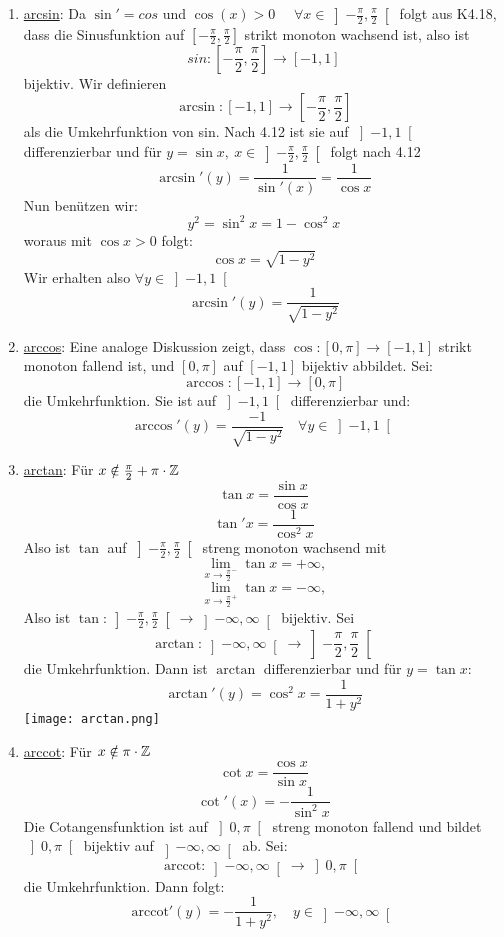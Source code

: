 \begin{enumerate}
    \item \underline{arcsin}: Da \(\sin' = cos\) und \( \cos(x) > 0 \quad\) \newline \(\forall x \in \left]-\frac{\pi}{2}, \frac{\pi}{2} \right[\) folgt aus K4.18, dass die Sinusfunktion auf \(\left[-\frac{\pi}{2}, \frac{\pi}{2}\right]\) strikt monoton wachsend ist, also ist
    \[ sin:\left[-\frac{\pi}{2}, \frac{\pi}{2}\right] \rightarrow \left[-1,1\right]\]
    bijektiv. Wir definieren
    \[\arcsin : \left[-1,1\right] \rightarrow \left[ -\frac{\pi}{2}, \frac{\pi}{2}\right]\]
    als die Umkehrfunktion von sin. Nach 4.12 ist sie auf \(\left]-1,1\right[\) differenzierbar und für \newline \( y = \sin x,\  x \in \left] -\frac{\pi}{2}, \frac{\pi}{2} \right[\) folgt nach 4.12
    \[\arcsin'(y) = \frac{1}{\sin'(x)} = \frac{1}{\cos x}\]
    Nun benützen wir:
    \[ y^2 = \sin^2x = 1 - \cos^2x\]
    woraus mit \( \cos x > 0 \) folgt:
    \[\cos x = \sqrt{1 - y^2}\]
    Wir erhalten also \( \forall y \in \left] -1,1 \right [\)
    \[ \arcsin'(y) = \frac{1}{\sqrt{1-y^2}}\]
    \item \underline{arccos}: Eine analoge Diskussion zeigt, dass \( \cos : \left[0,\pi\right] \rightarrow \left[-1,1\right]\) strikt monoton fallend ist, und \(\left[0,\pi\right]\) auf \( \left[-1,1\right]\) bijektiv abbildet. Sei:
    \[ \arccos : \left[-1,1\right] \rightarrow \left[0,\pi\right]\]
    die Umkehrfunktion. Sie ist auf \( \left] -1,1\right[\) differenzierbar und:
    \[ \arccos'(y) = \frac{-1}{\sqrt{1-y^2}} \quad \forall y \in \left]-1,1\right[\]
    \item \underline{arctan}: Für \( x \notin \frac{\pi}{2} + \pi \cdot \mathbb{Z} \)
    \[ \tan x = \frac{\sin x }{\cos x}\]
    \[ \tan' x = \frac{1}{\cos^2 x}\]
    Also ist \(\tan\) auf \( \left] -\frac{\pi}{2}, \frac{\pi}{2} \right[\) streng monoton wachsend mit
    \[ \lim_{x \rightarrow \frac{\pi}{2}^-} \tan x = +\infty,\]
    \[ \lim_{x \rightarrow \frac{\pi}{2}^+} \tan x = -\infty,\]
    Also ist \( \tan : \left]-\frac{\pi}{2}, \frac{\pi}{2} \right[ \rightarrow \left]-\infty, \infty \right[\) bijektiv. Sei
    \[ \arctan : \left] -\infty, \infty \right[ \rightarrow \left] -\frac{\pi}{2}, \frac{\pi}{2} \right[\]
    die Umkehrfunktion. Dann ist \(\arctan\) differenzierbar und für \( y = \tan x :\)
    \[ \arctan'(y) = \cos^2x = \frac{1}{1 + y^2}\]
    \hspace*{-8mm}\texttt{[image: arctan.png]}
    \item \underline{arccot}: Für \(x \notin \pi \cdot \mathbb{Z} \)
    \[ \cot x = \frac{\cos x }{\sin x}\]
    \[ \cot'(x) = -\frac{1}{\sin^2x} \]
    Die Cotangensfunktion ist auf \( \left] 0, \pi \right[\) streng monoton fallend und bildet \( \left] 0,\pi \right[\) bijektiv auf \( \left] -\infty,\infty\right[\) ab. Sei:
    \[ \text{arccot} : \left] -\infty, \infty \right[ \rightarrow \left] 0, \pi \right[\]
    die Umkehrfunktion. Dann folgt:
    \[ \text{arccot}'(y) = -\frac{1}{1+y^2}, \quad y \in \left] -\infty, \infty \right[\]
\end{enumerate}
